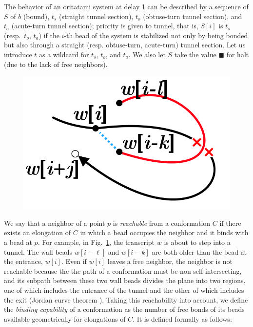The behavior of an oritatami system at delay 1 can be described by a sequence of $S$ of $b$ (bound), $t_s$ (straight tunnel section), $t_o$ (obtuse-turn tunnel section), and $t_a$ (acute-turn tunnel section); priority is given to tunnel, that is, $S[i]$ is $t_s$ (resp.~$t_o$, $t_a$) if the $i$-th bead of the system is stabilized not only by being bonded but also through a straight (resp. obtuse-turn, acute-turn) tunnel section. 
Let us introduce $t$ as a wildcard for $t_s$, $t_o$, and $t_a$. 
We also let $S$ take the value $\blacksquare$ for halt (due to the lack of free neighbors). 


\begin{figure}[tb]
\centering
\includegraphics[width=0.5\linewidth]{Fig/jordan_curve.png}
\caption{}
\label{fig:Jordan}
\end{figure}

We say that a neighbor of a point $p$ is \textit{reachable} from a conformation $C$ if there exists an elongation of $C$ in which a bead occupies the neighbor and it binds with a bead at $p$. 
For example, in Fig.~\ref{fig:Jordan}, the transcript $w$ is about to step into a tunnel. 
The wall beads $w[i-\ell]$ and $w[i-k]$ are both older than the bead at the entrance, $w[i]$. 
Even if $w[i]$ leaves a free neighbor, the neighbor is not reachable because the the path of a conformation must be non-self-intersecting, and its subpath between these two wall beads divides the plane into two regions, one of which includes the entrance of the tunnel and the other of which includes the exit (Jordan curve theorem \cite{Hales2007}). 
Taking this reachability into account, we define the \textit{binding capability} of a conformation as the number of free bonds of its beads available geometrically for elongations of $C$.
It is defined formally as follows: 

